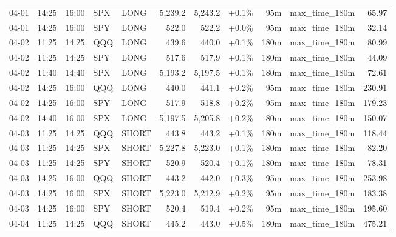 \documentclass[11pt,a4paper,twoside]{article}
\begin{document}
\begin{center}
\begin{longtable}{>{\color{txtmain}}l l l l l r r r r >{\color{txtmain}}l r}
04-01 & 14:25 & 16:00 & SPX & LONG & 5,239.2 & 5,243.2 & \textcolor{wingreen}{+0.1\%} & 95m & max\_time\_180m & \textcolor{wingreen}{65.97} \\
04-01 & 14:25 & 16:00 & SPY & LONG & 522.0 & 522.2 & \textcolor{wingreen}{+0.0\%} & 95m & max\_time\_180m & \textcolor{wingreen}{32.14} \\
04-02 & 11:25 & 14:25 & QQQ & LONG & 439.6 & 440.0 & \textcolor{wingreen}{+0.1\%} & 180m & max\_time\_180m & \textcolor{wingreen}{80.99} \\
04-02 & 11:25 & 14:25 & SPY & LONG & 517.6 & 517.9 & \textcolor{wingreen}{+0.1\%} & 180m & max\_time\_180m & \textcolor{wingreen}{44.09} \\
04-02 & 11:40 & 14:40 & SPX & LONG & 5,193.2 & 5,197.5 & \textcolor{wingreen}{+0.1\%} & 180m & max\_time\_180m & \textcolor{wingreen}{72.61} \\
04-02 & 14:25 & 16:00 & QQQ & LONG & 440.0 & 441.1 & \textcolor{wingreen}{+0.2\%} & 95m & max\_time\_180m & \textcolor{wingreen}{230.91} \\
04-02 & 14:25 & 16:00 & SPY & LONG & 517.9 & 518.8 & \textcolor{wingreen}{+0.2\%} & 95m & max\_time\_180m & \textcolor{wingreen}{179.23} \\
04-02 & 14:40 & 16:00 & SPX & LONG & 5,197.5 & 5,205.8 & \textcolor{wingreen}{+0.2\%} & 80m & max\_time\_180m & \textcolor{wingreen}{150.07} \\
04-03 & 11:25 & 14:25 & QQQ & SHORT & 443.8 & 443.2 & \textcolor{wingreen}{+0.1\%} & 180m & max\_time\_180m & \textcolor{wingreen}{118.44} \\
04-03 & 11:25 & 14:25 & SPX & SHORT & 5,227.8 & 5,223.0 & \textcolor{wingreen}{+0.1\%} & 180m & max\_time\_180m & \textcolor{wingreen}{82.20} \\
04-03 & 11:25 & 14:25 & SPY & SHORT & 520.9 & 520.4 & \textcolor{wingreen}{+0.1\%} & 180m & max\_time\_180m & \textcolor{wingreen}{78.31} \\
04-03 & 14:25 & 16:00 & QQQ & SHORT & 443.2 & 442.0 & \textcolor{wingreen}{+0.3\%} & 95m & max\_time\_180m & \textcolor{wingreen}{253.98} \\
04-03 & 14:25 & 16:00 & SPX & SHORT & 5,223.0 & 5,212.9 & \textcolor{wingreen}{+0.2\%} & 95m & max\_time\_180m & \textcolor{wingreen}{183.38} \\
04-03 & 14:25 & 16:00 & SPY & SHORT & 520.4 & 519.4 & \textcolor{wingreen}{+0.2\%} & 95m & max\_time\_180m & \textcolor{wingreen}{195.60} \\
04-04 & 11:25 & 14:25 & QQQ & SHORT & 445.2 & 443.0 & \textcolor{wingreen}{+0.5\%} & 180m & max\_time\_180m & \textcolor{wingreen}{475.21} \\

\end{longtable}
\end{center}
\end{document}
